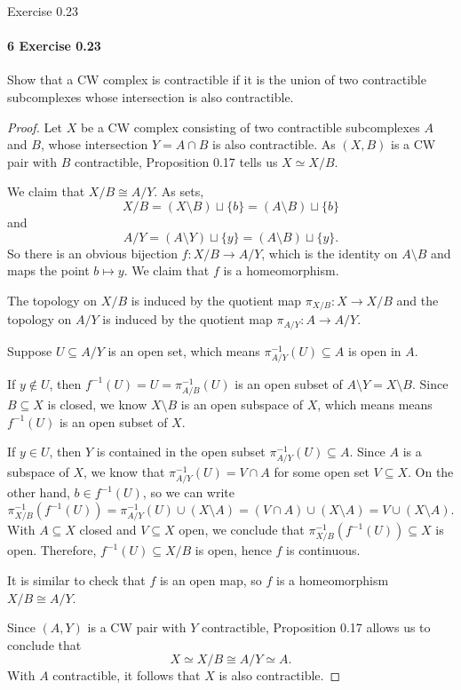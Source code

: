 \documentclass[12pt]{article}
\newlength{\myparskip}
\newenvironment{fullbox}{\begin{lrbox}{\savefullbox}\begin{minipage}{\dimexpr\textwidth-2\fboxsep\relax}\setlength{\parskip}{\myparskip}}{\end{minipage}\end{lrbox}\framebox[\textwidth]{\usebox{\savefullbox}}}
\newenvironment{pbox}[1][]{\begin{fullbox}\ifx#1\empty\else\paragraph{#1}\phantom{}\fi}{\end{fullbox}}
\theoremstyle{definition}
\newcommand{\<}{\langle}
\renewcommand{\>}{\rangle}
\newcommand{\isom}{\cong}
\newcommand{\seq}{\subseteq}
\newcommand{\htpy}{\simeq}
\begin{document}
\newpage
\begin{pbox}[6 Exercise 0.23]
    Show that a CW complex is contractible if it is the union of two contractible subcomplexes whose intersection is also contractible.
\end{pbox}

\begin{proof}
    Let $X$ be a CW complex consisting of two contractible subcomplexes $A$ and $B$, whose intersection $Y = A \cap B$ is also contractible.
    As $(X, B)$ is a CW pair with $B$ contractible, Proposition 0.17 tells us $X \htpy X/B$.

    We claim that $X/B \isom A/Y$.
    As sets,
    \[
        X/B = (X \setminus B) \sqcup \{b\} = (A \setminus B) \sqcup \{b\}
    \]
    and
    \[
        A/Y = (A \setminus Y) \sqcup \{y\} = (A \setminus B) \sqcup \{y\}.
    \]
    So there is an obvious bijection $f : X/B \to A/Y$, which is the identity on $A \setminus B$ and maps the point $b \mapsto y$. 
    We claim that $f$ is a homeomorphism.
    
    The topology on $X/B$ is induced by the quotient map $\pi_{X/B} : X \to X/B$ and the topology on $A/Y$ is induced by the quotient map $\pi_{A/Y} : A \to A/Y$.

    Suppose $U \seq A/Y$ is an open set, which means $\pi_{A/Y}^{-1}(U) \seq A$ is open in $A$.

    If $y \notin U$, then $f^{-1}(U) = U = \pi_{A/B}^{-1}(U)$ is an open subset of $A \setminus Y = X \setminus B$.
    Since $B \seq X$ is closed, we know $X \setminus B$ is an open subspace of $X$, which means means $f^{-1}(U)$ is an open subset of $X$.

    If $y \in U$, then $Y$ is contained in the open subset $\pi_{A/Y}^{-1}(U) \seq A$.
    Since $A$ is a subspace of $X$, we know that $\pi_{A/Y}^{-1}(U) = V \cap A$ for some open set $V \seq X$.
    On the other hand, $b \in f^{-1}(U)$, so we can write
    \[
        \pi_{X/B}^{-1}(f^{-1}(U)) 
            = \pi_{A/Y}^{-1}(U) \cup (X \setminus A)
            = (V \cap A) \cup (X \setminus A)
            = V \cup (X \setminus A).
    \]
    With $A \seq X$ closed and $V \seq X$ open, we conclude that $\pi_{X/B}^{-1}(f^{-1}(U)) \seq X$ is open. 
    Therefore, $f^{-1}(U) \seq X/B$ is open, hence $f$ is continuous.

    It is similar to check that $f$ is an open map, so $f$ is a homeomorphism $X/B \isom A/Y$.

    Since $(A, Y)$ is a CW pair with $Y$ contractible, Proposition 0.17 allows us to conclude that
    \[
        X \htpy X/B \isom A/Y \htpy A.
    \]
    With $A$ contractible, it follows that $X$ is also contractible.


\end{proof}
\end{document}
